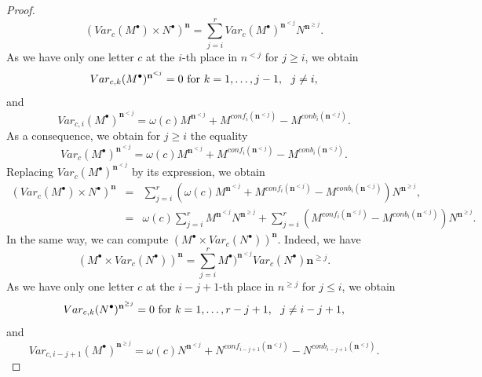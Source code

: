 \documentclass[english,11pt]{amsart}
\def\nn{\mathbf{n}}
\def\di{\displaystyle}
\def\nn{\mathbf{n}}
\begin{document}
\begin{proof}
\begin{equation}
\left (     Var_c (M^{\bullet})\times N^{\bullet} \right ) ^{\nn} = \di\sum_{j=i}^{r} Var_c (M^{\bullet})^{\nn^{<j}} N^{\nn^{\geq j}} .
\end{equation}
As we have only one letter $c$ at the $i$-th place in $n^{<j}$ for $j\geq i$, we obtain
\begin{equation}
    Var_{c,k} (M^{\bullet} )^{\nn^{<j}} =0 \ \mbox{\rm for}\  k=1,\dots , j-1,\ \ j\not= i ,  
\end{equation}
and
\begin{equation}
Var_{c,i} (M^{\bullet} )^{\nn^{<j}} = \omega (c) M^{\nn^{<j}} + M^{conf_i (\nn^{<j} )} -M^{conb_i (\nn^{<j} )} .
\end{equation}
As a consequence, we obtain for $j\geq i$ the equality
\begin{equation}
    Var_c (M^{\bullet})^{\nn^{<j}} =\omega (c) M^{\nn^{<j}} + M^{conf_i (\nn^{<j} )} -M^{conb_i (\nn^{<j} )} . 
\end{equation}
Replacing $Var_c (M^{\bullet})^{\nn^{<j}}$ by its expression, we obtain
\begin{equation}
\label{var1}
\left .
\begin{array}{lll}
\left (     Var_c (M^{\bullet})\times N^{\bullet} \right ) ^{\nn} & = & \di\sum_{j=i}^{r}  \left (  \omega (c) M^{\nn^{<j}} + M^{conf_i (\nn^{<j} )} -M^{conb_i (\nn^{<j} )} \right )  N^{\nn^{\geq j}} ,\\
 & =  & \omega (c) \di\sum_{j=i}^r M^{\nn^{<j}} N^{\nn^{\geq j}}
 + \di\sum_{j=i}^{r}  \left ( M^{conf_i (\nn^{<j} )} -M^{conb_i (\nn^{<j} )} \right )  N^{\nn^{\geq j}} .
\end{array}
\right .
\end{equation}
In the same way, we can compute $\left ( M^{\bullet} \times Var_c (N^{\bullet} ) \right ) ^{\nn}$. Indeed, we have 
\begin{equation}
\left (     M^{\bullet}\times Var_c (N^{\bullet} ) \right ) ^{\nn} = \di\sum_{j=i}^{r} M^{\bullet})^{\nn^{<j}} Var_c (N^{\bullet} ){\nn^{\geq j}} .
\end{equation}
As we have only one letter $c$ at the $i-j+1$-th place in $n^{\geq j}$ for $j\leq i$, we obtain
\begin{equation}
    Var_{c,k} (N^{\bullet} )^{\nn^{\geq j}} =0 \ \mbox{\rm for}\  k=1,\dots , r-j+1,\ \ j\not= i-j+1 ,  
\end{equation}
and
\begin{equation}
Var_{c,i-j+1} (M^{\bullet} )^{\nn^{\geq j}} = \omega (c) N^{\nn^{<j}} + N^{conf_{i-j+1} (\nn^{<j} )} -N^{conb_{i-j+1} (\nn^{<j} )} .

\end{equation}
\end{proof}
\end{document}
